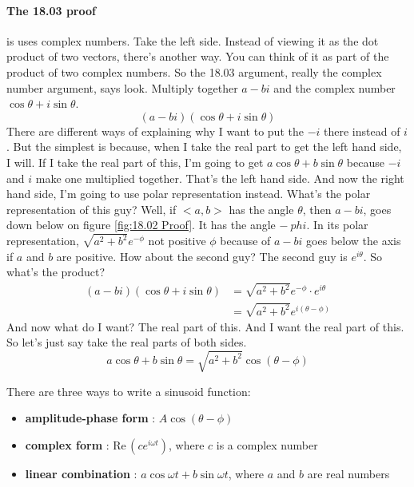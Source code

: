 \paragraph{The 18.03 proof} is uses complex numbers.
Take the left side. Instead of viewing it as the dot product of two vectors,
there's another way.
You can think of it as part of the product of two complex numbers.
So the 18.03 argument, really the complex number argument, says look.
Multiply together $a -bi$ and the complex number $\cos \theta + i \sin \theta$.
\begin{equation*}
  (a - bi)(\cos \theta + i \sin \theta)
\end{equation*}
There are different ways of explaining why I want to put the $-i$ there instead of $i$.
But the simplest is because, when I take the real part to get the left hand side, I will.
If I take the real part of this, I'm going to get $a \cos \theta + b \sin \theta$
because $-i$ and $i$ make one multiplied together.
That's the left hand side. And now the right hand side, I'm going
to use polar representation instead. What's the polar representation of this guy?
Well, if $<a, b>$ has the angle $\theta$, then $a -bi$, goes down below on figure \ref{fig:18.02 Proof}.
It has the angle $- \ phi$. 
In its polar representation, $\sqrt{a^2 + b^2} e^{-\phi}$ not positive $\phi$
because of $a -bi$ goes below the axis if $a$ and $b$ are positive.
How about the second guy?
The second guy is $e^{i \theta}$. 
So what's the product?
\begin{align*}
  (a - bi)(\cos \theta + i \sin \theta) &= \sqrt{a^2 + b^2} e^{-\phi} \cdot e^{i \theta}\\
  &= \sqrt{a^2 + b^2} e^{i(\theta - \phi)}
\end{align*}
And now what do I want? The real part of this.
And I want the real part of this.
So let's just say take the real parts of both sides.
\begin{equation*}
  a \cos \theta + b \sin \theta = \sqrt{a^2 + b^2} \cos(\theta - \phi)
\end{equation*}

There are three ways to write a sinusoid function:
\begin{itemize}
\item \textbf{\color{blue}amplitude-phase form } : $\displaystyle A \cos \left(\theta -\phi \right)$
\item \textbf{\color{blue}complex form } : $\mathrm{Re\, }\left(c e^{i\omega t} \right)$, where $c$ is a complex number
\item \textbf{\color{blue}linear combination } : $a \cos \omega t + b \sin \omega t$, where $a$ and $b$ are real numbers
\end{itemize}

